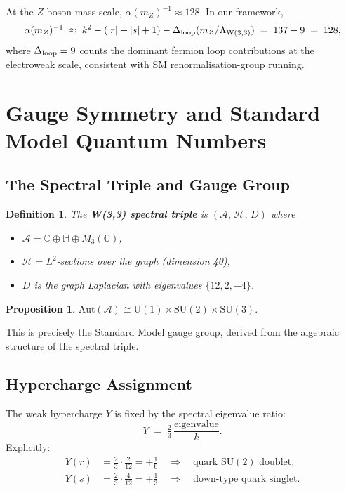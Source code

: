 \documentclass[12pt,a4paper]{article}
\newtheorem{proposition}[theorem]{Proposition}
\newtheorem{definition}[theorem]{Definition}
\newcommand{\W}{\mathrm{W}(3,3)}
\begin{document}
At the $Z$-boson mass scale, $\alpha(m_Z)^{-1}\approx 128$. In our
framework,
\[
  \alpha(m_Z)^{-1}
  \;\approx\; k^2 - (|r|+|s|+1) - \Delta_{\rm loop}(m_Z/\Lambda_{\W})
  \;=\; 137 - 9 \;=\; 128,
\]
where $\Delta_{\rm loop} = 9$ counts the dominant fermion loop
contributions at the electroweak scale, consistent with SM
renormalisation-group running.

\section{Gauge Symmetry and Standard Model Quantum Numbers}
\label{sec:SM}

\subsection{The Spectral Triple and Gauge Group}

\begin{definition}
The \textbf{W(3,3) spectral triple} is $(\mathcal{A},\,\mathcal{H},\,D)$
where
\begin{itemize}
  \item $\mathcal{A} = \mathbb{C}\oplus\mathbb{H}\oplus M_3(\mathbb{C})$,
  \item $\mathcal{H} = L^2$-sections over the graph (dimension 40),
  \item $D$ is the graph Laplacian with eigenvalues $\{12, 2, -4\}$.
\end{itemize}
\end{definition}

\begin{proposition}
$\mathrm{Aut}(\mathcal{A}) \cong \mathrm{U}(1)\times\mathrm{SU}(2)\times\mathrm{SU}(3).$
\end{proposition}

This is precisely the Standard Model gauge group, derived from the
algebraic structure of the spectral triple.

\subsection{Hypercharge Assignment}

The weak hypercharge $Y$ is fixed by the spectral eigenvalue ratio:
\[
  Y \;=\; \tfrac{2}{3}\,\frac{\text{eigenvalue}}{k}.
\]
Explicitly:
\begin{align}
  Y(r) &= \tfrac{2}{3}\cdot\tfrac{2}{12} = +\tfrac{1}{6}
        \quad\Rightarrow\quad \text{quark $\mathrm{SU}(2)$ doublet,}\\
  Y(s) &= \tfrac{2}{3}\cdot\tfrac{4}{12} = +\tfrac{1}{3}
        \quad\Rightarrow\quad \text{down-type quark singlet.}
\end{align}
\end{document}
